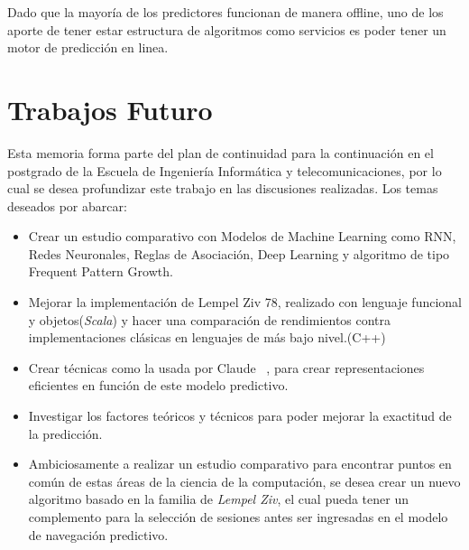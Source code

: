 Dado que la mayoría de los predictores funcionan de 
manera offline, uno de los aporte de tener estar estructura de algoritmos como servicios es poder tener un motor de predicción en linea.





\section{Trabajos Futuro}

Esta memoria forma parte del plan de continuidad para la continuación en el postgrado de la Escuela de Ingeniería Informática y telecomunicaciones, por lo cual se desea profundizar este trabajo en las discusiones realizadas. Los temas deseados por abarcar:

\begin{itemize}

\item Crear un estudio comparativo con Modelos de Machine Learning como RNN, Redes Neuronales, Reglas de Asociación, Deep Learning y algoritmo de tipo Frequent Pattern Growth.

\item Mejorar la implementación de Lempel Ziv 78, realizado con lenguaje funcional y objetos(\emph{Scala}) y hacer una comparación de rendimientos contra implementaciones clásicas en lenguajes de más bajo nivel.(C++)


\item Crear técnicas como la usada por Claude \etal~\cite{Claude2014}, para crear representaciones eficientes en función de este modelo predictivo.


\item Investigar los factores teóricos y técnicos para poder mejorar la exactitud de la predicción.

\item Ambiciosamente a realizar un estudio comparativo para encontrar puntos en común de estas áreas de la ciencia de la computación, se desea crear un nuevo algoritmo basado en la familia de \emph{Lempel Ziv}, el cual pueda tener un complemento para la selección de sesiones antes ser ingresadas en el modelo de navegación predictivo. 


	
\end{itemize}	






 








